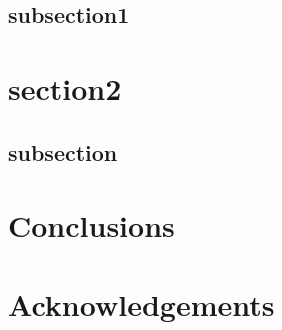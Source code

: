 \documentclass[aps,%
twocolumn,%
floatfix,%
pra,%
amsfonts,%
longbibliography,%
groupedaddress,%
superscriptaddress]{revtex4-2}%
\newcommand{\1}{\mathbbm{1}}
\begin{document}
\subsection{subsection1}



\section{section2}


\subsection{subsection}



\section{Conclusions}



\section*{Acknowledgements} 






\end{document}
